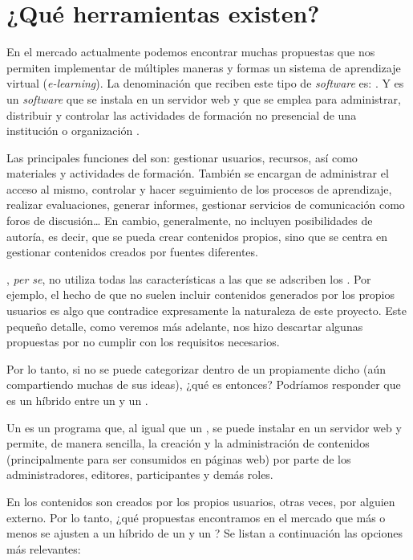 \section{¿Qué herramientas existen?}

En el mercado actualmente podemos encontrar muchas propuestas que nos permiten implementar de múltiples maneras y formas un sistema de aprendizaje virtual (\textit{e-learning}). La denominación que reciben este tipo de \textit{software} es: \lms{}. Y es un \textit{software} que se instala en un servidor web y que se emplea para administrar, distribuir y controlar las actividades de formación no presencial de una institución o organización \cite{web:lms}.

Las principales funciones del \lms{} son: gestionar usuarios, recursos, así como materiales y actividades de formación. También se encargan de administrar el acceso al mismo, controlar y hacer seguimiento de los procesos de aprendizaje, realizar evaluaciones, generar informes, gestionar servicios de comunicación como foros de discusión\ldots{} En cambio, generalmente, no incluyen posibilidades de autoría, es decir, que se pueda crear contenidos propios, sino que se centra en gestionar contenidos creados por fuentes diferentes.

\alma{}, \textit{per se}, no utiliza todas las características a las que se adscriben los \lms{}. Por ejemplo, el hecho de que no suelen incluir contenidos generados por los propios usuarios es algo que contradice expresamente la naturaleza de este proyecto. Este pequeño detalle, como veremos más adelante, nos hizo descartar algunas propuestas por no cumplir con los requisitos necesarios.

Por lo tanto, si \alma{} no se puede categorizar dentro de un \lms{} propiamente dicho (aún compartiendo muchas de sus ideas), ¿qué es entonces? Podríamos responder que es un híbrido entre un \lms{} y un \cms{} \cite{web:cms}.

Un \cms{} es un programa que, al igual que un \lms{}, se puede instalar en un servidor web y permite, de manera sencilla, la creación y la administración de contenidos (principalmente para ser consumidos en páginas web) por parte de los administradores, editores, participantes y demás roles.

En \alma{} los contenidos son creados por los propios usuarios, otras veces, por alguien externo. Por lo tanto, ¿qué propuestas encontramos en el mercado que más o menos se ajusten a un híbrido de un \lms{} y un \cms{}? Se listan a continuación las opciones más relevantes:

